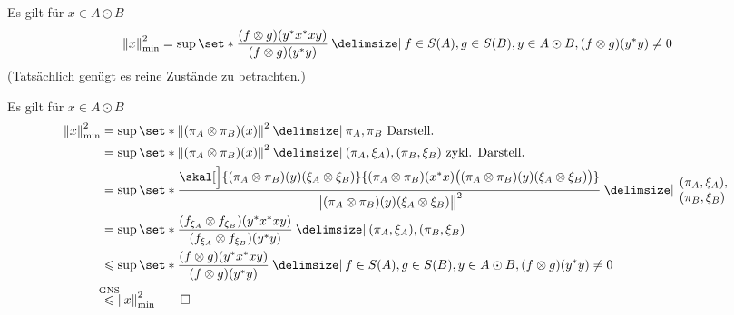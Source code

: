 \begin{satz}[label=satz:120]
	Es gilt für $x \in A \odot B$
	\[
		\norm*{x}^2_{\min} = \sup \set*{\frac{(f \otimes g) (y^*x^*xy)}{(f \otimes g)(y^*y)} \given f \in S(A), g \in S(B), y \in A \odot B, (f \otimes g)(y^* y)\neq 0 }
	\]
	(Tatsächlich genügt es reine Zustände zu betrachten.)
\end{satz}
\begin{beweis}
	Es gilt für $x \in A \odot B$
	\begin{align}
		\norm*{x}_{\min}^2 &= \sup \set*{\norm*{(\pi_A \otimes \pi_B)(x)}^2 \given \pi_A, \pi_B \text{ Darstell.} } \\
		&= \sup \set*{ \norm*{(\pi_A \otimes \pi_B)(x)}^2 \given (\pi_A,\xi_A), (\pi_B,\xi_B) \text{ zykl. Darstell.}} \\
		&= \sup \set*{ \frac{\skal[\Big]{(\pi_A \otimes \pi_B)(y) \enbrace*{\xi_A \otimes \xi_B}}{(\pi_A \otimes \pi_B)(x^*x) \enbrace[\big]{ (\pi_A \otimes \pi_B)(y) \enbrace*{\xi_A \otimes \xi_B}}}}{\norm[\big]{(\pi_A \otimes \pi_B)(y) \enbrace*{\xi_A \otimes \xi_B}}^2}  \given\hspace{-3pt} \begin{array}{l}
	(\pi_A,\xi_A), \\
	(\pi_B, \xi_B)
\end{array} \hspace{-3pt}} \\
		&= \sup \set*{ \frac{\enbrace*{f_{\xi_A} \otimes f_{\xi_B}} \enbrace*{y^*x^*xy}}{\enbrace*{f_{\xi_A} \otimes f_{\xi_B} }(y^*y)} \given (\pi_A,\xi_A), (\pi_B, \xi_B)} \\
		&\le \sup \set*{ \frac{(f \otimes g)(y^*x^* xy)}{(f \otimes g)(y^*y)} \given f \in S(A) , g \in S(B), y \in A \odot B, (f \otimes g)(y^* y)\neq 0 } \\
		&\StackTextClap{GNS}{\le} \norm*{x}_{\min}^2 \qedhere
	\end{align}
\end{beweis}

